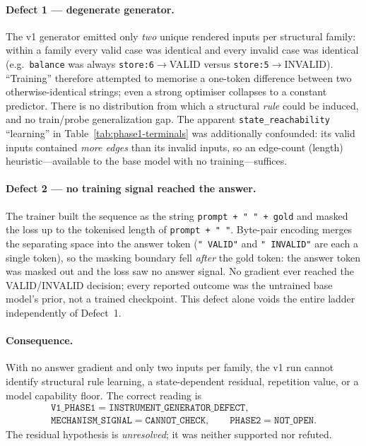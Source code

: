 \documentclass[11pt]{article}
\begin{document}
\paragraph{Defect 1 --- degenerate generator.} The v1 generator emitted only \emph{two} unique rendered inputs per structural family: within a family every valid case was identical and every invalid case was identical (e.g.\ \texttt{balance} was always \texttt{store:6}$\to$VALID versus \texttt{store:5}$\to$INVALID). ``Training'' therefore attempted to memorise a one-token difference between two otherwise-identical strings; even a strong optimiser collapses to a constant predictor. There is no distribution from which a structural \emph{rule} could be induced, and no train/probe generalization gap. The apparent \texttt{state\_reachability} ``learning'' in Table~\ref{tab:phase1-terminals} was additionally confounded: its valid inputs contained \emph{more edges} than its invalid inputs, so an edge-count (length) heuristic---available to the base model with no training---suffices.

\paragraph{Defect 2 --- no training signal reached the answer.} The trainer built the sequence as the string \texttt{prompt + " " + gold} and masked the loss up to the tokenised length of \texttt{prompt + " "}. Byte-pair encoding merges the separating space into the answer token (\texttt{" VALID"} and \texttt{" INVALID"} are each a single token), so the masking boundary fell \emph{after} the gold token: the answer token was masked out and the loss saw no answer signal. No gradient ever reached the VALID/INVALID decision; every reported outcome was the untrained base model's prior, not a trained checkpoint. This defect alone voids the entire ladder independently of Defect~1.

\paragraph{Consequence.} With no answer gradient and only two inputs per family, the v1 run cannot identify structural rule learning, a state-dependent residual, repetition value, or a model capability floor. The correct reading is
\begin{gather*}
\texttt{V1\_PHASE1}=\texttt{INSTRUMENT\_GENERATOR\_DEFECT},\\
\texttt{MECHANISM\_SIGNAL}=\texttt{CANNOT\_CHECK},\qquad
\texttt{PHASE2}=\texttt{NOT\_OPEN}.
\end{gather*}
The residual hypothesis is \emph{unresolved}; it was neither supported nor refuted.
\end{document}
